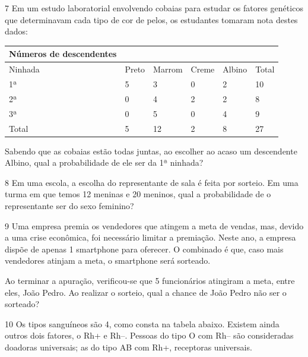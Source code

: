 \num{7} Em um estudo laboratorial envolvendo cobaias para estudar os fatores
genéticos que determinavam cada tipo de cor de pelos, os estudantes
tomaram nota destes dados:

\begin{longtable}[]{@{}llllll@{}}
\toprule
\textbf{Números de descendentes}\tabularnewline
\midrule
\endhead
Ninhada & Preto & Marrom & Creme & Albino & Total\tabularnewline
1ª & 5 & 3 & 0 & 2 & 10\tabularnewline
2ª & 0 & 4 & 2 & 2 & 8\tabularnewline
3ª & 0 & 5 & 0 & 4 & 9\tabularnewline
Total & 5 & 12 & 2 & 8 & 27\tabularnewline
\bottomrule
\end{longtable}

Sabendo que as cobaias estão todas juntas, ao escolher ao acaso um
descendente Albino, qual a probabilidade de ele ser da 1ª ninhada?

\begin{emptybox}
\end{emptybox}

\num{8} Em uma escola, a escolha do representante de sala é feita por sorteio.
Em uma turma em que temos 12 meninas e 20 meninos, qual a probabilidade
de o representante ser do sexo feminino?

\begin{emptybox}
\end{emptybox}

\num{9} Uma empresa premia os vendedores que atingem a meta de
vendas, mas, devido a uma crise econômica, foi necessário limitar a 
premiação. Neste ano, a empresa dispõe de apenas 1 smartphone para 
oferecer. O combinado é que, caso mais vendedores atinjam 
a meta, o smartphone será sorteado.

Ao terminar a apuração, verificou-se que 5 funcionários atingiram a
meta, entre eles, João Pedro. Ao realizar o sorteio, qual a chance de
João Pedro não ser o sorteado?

\begin{emptybox}
\end{emptybox}

\num{10} Os tipos sanguíneos são 4, como consta na tabela abaixo. Existem ainda
outros dois fatores, o Rh+ e Rh--. Pessoas do tipo O com Rh-- são consideradas 
doadoras universais; as do tipo AB com Rh+, receptoras universais.


